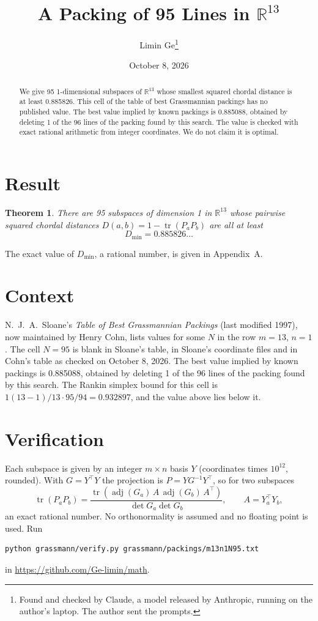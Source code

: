 \documentclass[11pt,a4paper]{article}
\title{A Packing of 95 Lines in $\mathbb{R}^{13}$}
\author{Limin Ge\thanks{Found and checked by Claude, a model released by Anthropic, running on the author's laptop. The author sent the prompts.}}
\date{October 8, 2026}
\newtheorem*{theorem}{Theorem}
\begin{document}
\maketitle
\begin{abstract}
We give 95 1-dimensional subspaces of $\mathbb{R}^{13}$ whose smallest squared chordal distance is at least 0.885826. This cell of the table of best Grassmannian packings has no published value. The best value implied by known packings is 0.885088, obtained by deleting 1 of the 96 lines of the packing found by this search. The value is checked with exact rational arithmetic from integer coordinates. We do not claim it is optimal.
\end{abstract}

\section{Result}
\begin{theorem}
There are 95 subspaces of dimension 1 in $\mathbb{R}^{13}$ whose pairwise squared chordal distances $D(a,b) = 1 - \operatorname{tr}(P_aP_b)$ are all at least
\[ D_{\min} = 0.885826\ldots \]
\end{theorem}
The exact value of $D_{\min}$, a rational number, is given in Appendix~A.


\section{Context}
N.~J.~A.~Sloane's \emph{Table of Best Grassmannian Packings} (last modified 1997), now maintained by Henry Cohn, lists values for some $N$ in the row $m=13$, $n=1$. The cell $N=95$ is blank in Sloane's table, in Sloane's coordinate files and in Cohn's table as checked on October 8, 2026. The best value implied by known packings is 0.885088, obtained by deleting 1 of the 96 lines of the packing found by this search. The Rankin simplex bound for this cell is $1(13-1)/13\cdot 95/94 = 0.932897$, and the value above lies below it.


\section{Verification}
Each subspace is given by an integer $m\times n$ basis $Y$ (coordinates times $10^{12}$, rounded). With $G=Y^\top Y$ the projection is $P=YG^{-1}Y^\top$, so for two subspaces
\[ \operatorname{tr}(P_aP_b)=\frac{\operatorname{tr}(\operatorname{adj}(G_a)\,A\,\operatorname{adj}(G_b)\,A^\top)}{\det G_a\det G_b},\qquad A=Y_a^\top Y_b, \]
an exact rational number. No orthonormality is assumed and no floating point is used. Run
\begin{verbatim}
python grassmann/verify.py grassmann/packings/m13n1N95.txt
\end{verbatim}
in \url{https://github.com/Ge-limin/math}.
\end{document}
